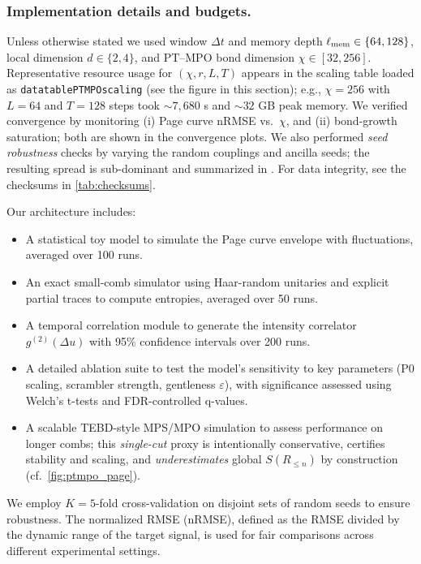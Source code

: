 \documentclass[11pt,a4paper]{article}
\theoremstyle{plain}
\theoremstyle{definition}
\theoremstyle{remark}
\begin{document}
\subsubsection{Implementation details and budgets.}
Unless otherwise stated we used window \(\Delta t\) and memory depth \(\ell_{\rm mem}\in\{64,128\}\), local dimension \(d\in\{2,4\}\), and PT--MPO bond dimension \(\chi\in[32,256]\).
Representative resource usage for \((\chi,r,L,T)\) appears in the scaling table loaded as \texttt{datatablePTMPOscaling} (see the figure in this section);
e.g., \(\chi=256\) with \(L=64\) and \(T=128\) steps took \(\sim 7{,}680\) s and \(\sim 32\) GB peak memory.
We verified convergence by monitoring (i) Page curve nRMSE vs.\ \(\chi\), and (ii) bond-growth saturation; both are shown in the convergence plots.
We also performed \emph{seed robustness} checks by varying the random couplings and ancilla seeds; the resulting spread is sub-dominant and summarized in .
For data integrity, see the checksums in \cref{tab:checksums}.

Our architecture includes:
\begin{itemize}[leftmargin=*]
    \item A statistical toy model to simulate the Page curve envelope with fluctuations, averaged over 100 runs.
    \item An exact small-comb simulator using Haar-random unitaries and explicit partial traces to compute entropies, averaged over 50 runs.
    \item A temporal correlation module to generate the intensity correlator $g^{(2)}(\Delta u)$ with 95\% confidence intervals over 200 runs.
    \item A detailed ablation suite to test the model's sensitivity to key parameters (P0 scaling, scrambler strength, gentleness $\varepsilon$), with significance assessed using Welch's t-tests and FDR-controlled q-values.
    \item A scalable TEBD-style MPS/MPO simulation to assess performance on longer combs; this \emph{single-cut} proxy is intentionally conservative, certifies stability and scaling, and \emph{underestimates} global $S(R_{\le n})$ by construction (cf.~\cref{fig:ptmpo_page}).
\end{itemize}
We employ $K=5$-fold cross-validation on disjoint sets of random seeds to ensure robustness. The normalized RMSE (nRMSE), defined as the RMSE divided by the dynamic range of the target signal, is used for fair comparisons across different experimental settings.
\end{document}
